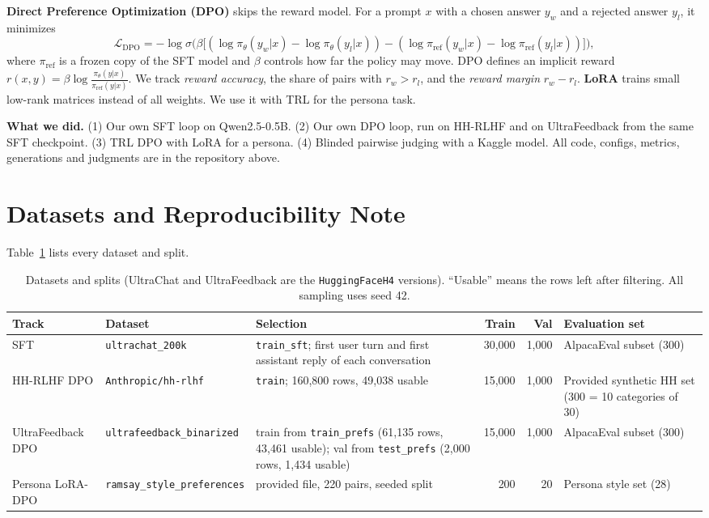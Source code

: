 \documentclass[10pt]{article}
\newcommand{\code}[1]{\texttt{\small #1}}
\begin{document}
\textbf{Direct Preference Optimization (DPO)} \cite{rafailov2023} skips the reward model. For a prompt $x$ with a
chosen answer $y_w$ and a rejected answer $y_l$, it minimizes
\begin{equation}
\mathcal{L}_{\text{DPO}} = -\log \sigma\Big(\beta\big[(\log \pi_\theta(y_w|x) - \log \pi_\theta(y_l|x)) -
(\log \pi_{\text{ref}}(y_w|x) - \log \pi_{\text{ref}}(y_l|x))\big]\Big),
\end{equation}
where $\pi_{\text{ref}}$ is a frozen copy of the SFT model and $\beta$ controls how far the policy may move. DPO
defines an implicit reward $r(x,y) = \beta \log \frac{\pi_\theta(y|x)}{\pi_{\text{ref}}(y|x)}$. We track
\emph{reward accuracy}, the share of pairs with $r_w > r_l$, and the \emph{reward margin} $r_w - r_l$.
\textbf{LoRA} \cite{hu2022} trains small low-rank matrices instead of all weights. We use it with TRL for the
persona task.

\textbf{What we did.} (1) Our own SFT loop on Qwen2.5-0.5B. (2) Our own DPO loop, run on HH-RLHF and on
UltraFeedback from the same SFT checkpoint. (3) TRL DPO with LoRA for a persona. (4) Blinded pairwise judging with a
Kaggle model. All code, configs, metrics, generations and judgments are in the repository above.

\section{Datasets and Reproducibility Note}
Table~\ref{tab:data} lists every dataset and split.

\begin{table}[h]
\centering\footnotesize
\begin{tabularx}{\textwidth}{@{}l >{\raggedright\arraybackslash}p{4.1cm} >{\raggedright\arraybackslash}X r r >{\raggedright\arraybackslash}p{2.7cm}@{}}
\toprule
Track & Dataset & Selection & Train & Val & Evaluation set \\
\midrule
SFT & \code{ultrachat\_200k} \cite{ding2023,tunstall2023} & \code{train\_sft}; first user turn and first
assistant reply of each conversation & 30,000 & 1,000 & AlpacaEval subset (300) \\
HH-RLHF DPO & \code{Anthropic/hh-rlhf} \cite{bai2022} & \code{train}; 160,800 rows, 49,038 usable &
15,000 & 1,000 & Provided synthetic HH set (300 = 10 categories of 30) \\
UltraFeedback DPO & \code{ultrafeedback\_binarized} \cite{cui2023,tunstall2023} & train from \code{train\_prefs}
(61,135 rows, 43,461 usable); val from \code{test\_prefs} (2,000 rows, 1,434 usable) & 15,000 & 1,000 &
AlpacaEval subset (300) \\
Persona LoRA-DPO & \code{ramsay\_style\_preferences} & provided file, 220 pairs, seeded split & 200 & 20 &
Persona style set (28) \\
\bottomrule
\end{tabularx}
\caption{Datasets and splits (UltraChat and UltraFeedback are the \code{HuggingFaceH4} versions). ``Usable'' means
the rows left after filtering. All sampling uses seed 42.}
\label{tab:data}
\end{table}
\end{document}
